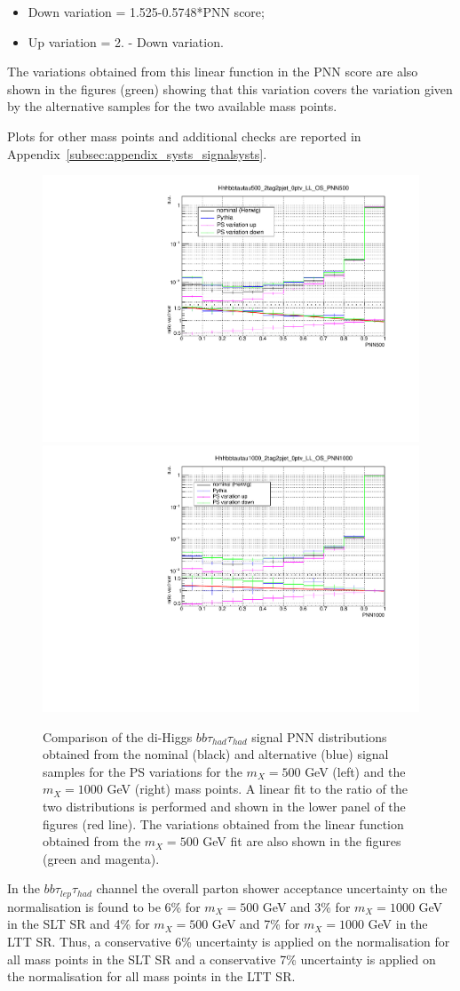 \begin{itemize}
\item Down variation = 1.525-0.5748*PNN score;
\item Up variation = 2. - Down variation.
\end{itemize}

The variations obtained from this linear function in the PNN score are also shown in the figures (green) showing that this variation covers the variation given by the alternative samples for the two available mass points.

Plots for other mass points and additional checks are reported in Appendix~\ref{subsec:appendix_systs_signalsysts}.

\begin{figure}
\centering
\includegraphics[width=.49\textwidth]{figures/systs/HadHad_Signal_500_PNN_SystsApplied_Fit_log.pdf}
\includegraphics[width=.49\textwidth]{figures/systs/HadHad_Signal_1000_PNN_SystsApplied_Fit_log.pdf}
\caption{Comparison of the di-Higgs $bb\tau_{had}\tau_{had}$ signal PNN distributions obtained from the nominal (black) and alternative (blue) signal samples for the PS variations for the  $m_X= 500$ GeV (left) and the $m_X=1000$ GeV (right) mass points. A linear fit to the ratio of the two distributions is performed and shown in the lower panel of the figures (red line). The variations obtained from the linear function obtained from the $m_X= 500$ GeV fit are also shown in the figures (green and magenta).}
\label{fig:HadHadSignalSysts}
\end{figure}

In the $bb\tau_{lep}\tau_{had}$ channel the overall parton shower acceptance uncertainty on the normalisation is found to be 6\% for $m_X= 500$ GeV and 3\% for  $m_X=1000$ GeV in the SLT SR and 4\% for $m_X= 500$ GeV and 7\% for  $m_X=1000$ GeV in the LTT SR. Thus, a conservative 6\% uncertainty is applied on the normalisation for all mass points in the SLT SR and a conservative 7\% uncertainty is applied on the normalisation for all mass points in the LTT SR.

